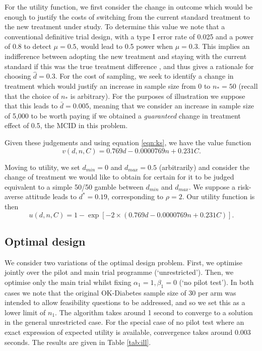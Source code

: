 \documentclass[sagev, Crown]{sagej} %
\begin{document}
For the utility function, we first consider the change in outcome which would be enough to justify the costs of switching from the current standard treatment to the new treatment under study. To determine this value we note that a conventional definitive trial design, with a type I error rate of 0.025 and a power of 0.8 to detect $\mu = 0.5$, would lead to 0.5 power when $\mu = 0.3$. This implies an indifference between adopting the new treatment and staying with the current standard if this was the true treatment difference \cite{Willan2005}, and thus gives a rationale for choosing $\hat{d} = 0.3$. For the cost of sampling, we seek to identify a change in treatment which would justify an increase in sample size from 0 to $n_* = 50$ (recall that the choice of $n_*$ is arbitrary). For the purposes of illustration we suppose that this leads to $\bar{d} = 0.005$, meaning that we consider an increase in sample size of 5,000 to be worth paying if we obtained a \emph{guaranteed} change in treatment effect of 0.5, the MCID in this problem.

Given these judgements and using equation \ref{eqn:ks}, we have the value function
$$ 
v(d, n, C) = 0.769 d - 0.0000769 n + 0.231 C.
$$

Moving to utility, we set $d_{min} = 0$ and $d_{max} = 0.5$ (arbitrarily) and consider the change of treatment we would like to obtain for certain for it to be judged equivalent to a simple 50/50 gamble between $d_{min}$ and $d_{max}$. We suppose a risk-averse attitude leads to $d^* = 0.19$, corresponding to $\rho = 2$. Our utility function is then
$$
u(d, n, C) = 1 - \exp[ - 2 \times (0.769 d - 0.0000769 n + 0.231 C)].
$$

\subsection{Optimal design}

We consider two variations of the optimal design problem. First, we optimise jointly over the pilot and main trial programme (`unrestricted'). Then, we optimise only the main trial whilst fixing $\alpha_1 = 1, \beta_1 = 0$ (`no pilot test'). In both cases we note that the original OK-Diabetes sample size of 30 per arm was intended to allow feasibility questions to be addressed, and so we set this as a lower limit of $n_1$. The algorithm takes around 1 second to converge to a solution in the general unrestricted case. For the special case of no pilot test where an exact expression of expected utility is available, convergence takes around 0.003 seconds. The results are given in Table \ref{tab:ill}. 
\end{document}
